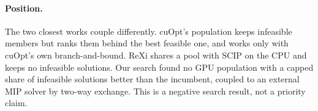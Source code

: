 \paragraph{Position.} The two closest works couple differently. cuOpt's population keeps infeasible members but ranks
them behind the best feasible one, and works only with cuOpt's own branch-and-bound. ReXi shares a pool with SCIP on the
CPU and keeps no infeasible solutions. Our search found no GPU population with a capped share of infeasible solutions
better than the incumbent, coupled to an external MIP solver by two-way exchange. This is a negative search result, not
a priority claim.
\FloatBarrier
